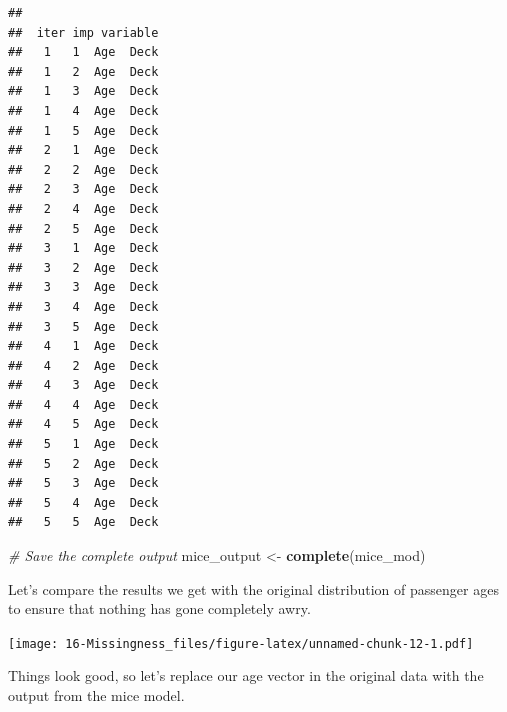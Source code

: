 \documentclass[]{book}
\newenvironment{Shaded}{\begin{snugshade}}{\end{snugshade}}
\newcommand{\KeywordTok}[1]{\textcolor[rgb]{0.13,0.29,0.53}{\textbf{#1}}}
\newcommand{\DataTypeTok}[1]{\textcolor[rgb]{0.13,0.29,0.53}{#1}}
\newcommand{\DecValTok}[1]{\textcolor[rgb]{0.00,0.00,0.81}{#1}}
\newcommand{\FloatTok}[1]{\textcolor[rgb]{0.00,0.00,0.81}{#1}}
\newcommand{\StringTok}[1]{\textcolor[rgb]{0.31,0.60,0.02}{#1}}
\newcommand{\CommentTok}[1]{\textcolor[rgb]{0.56,0.35,0.01}{\textit{#1}}}
\newcommand{\OperatorTok}[1]{\textcolor[rgb]{0.81,0.36,0.00}{\textbf{#1}}}
\newcommand{\NormalTok}[1]{#1}
\theoremstyle{definition}
\theoremstyle{definition}
\theoremstyle{definition}
\theoremstyle{remark}
\begin{document}
\begin{verbatim}
## 
##  iter imp variable
##   1   1  Age  Deck
##   1   2  Age  Deck
##   1   3  Age  Deck
##   1   4  Age  Deck
##   1   5  Age  Deck
##   2   1  Age  Deck
##   2   2  Age  Deck
##   2   3  Age  Deck
##   2   4  Age  Deck
##   2   5  Age  Deck
##   3   1  Age  Deck
##   3   2  Age  Deck
##   3   3  Age  Deck
##   3   4  Age  Deck
##   3   5  Age  Deck
##   4   1  Age  Deck
##   4   2  Age  Deck
##   4   3  Age  Deck
##   4   4  Age  Deck
##   4   5  Age  Deck
##   5   1  Age  Deck
##   5   2  Age  Deck
##   5   3  Age  Deck
##   5   4  Age  Deck
##   5   5  Age  Deck
\end{verbatim}

\begin{Shaded}
\begin{Highlighting}[]
\CommentTok{# Save the complete output }
\NormalTok{mice_output <-}\StringTok{ }\KeywordTok{complete}\NormalTok{(mice_mod)}
\end{Highlighting}
\end{Shaded}

Let's compare the results we get with the original distribution of
passenger ages to ensure that nothing has gone completely awry.

\begin{Shaded}
\end{Shaded}

\texttt{[image: 16-Missingness\_files/figure-latex/unnamed-chunk-12-1.pdf]}

Things look good, so let's replace our age vector in the original data
with the output from the mice model.
\end{document}
